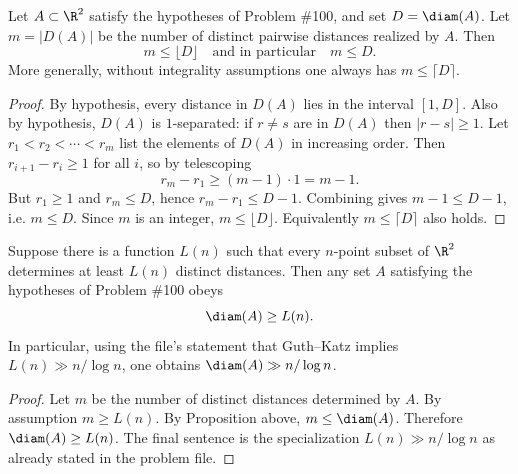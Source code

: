 \begin{proposition}
Let $A\subset\R^2$ satisfy the hypotheses of Problem \#100, and set $D=\diam(A)$. Let $m=|D(A)|$ be the number of distinct pairwise distances realized by $A$. Then
\[m\le \lfloor D\rfloor\quad\text{and in particular}\quad m\le D.
\]
More generally, without integrality assumptions one always has $m\le \lceil D\rceil$.
\end{proposition}

\begin{proof}
By hypothesis, every distance in $D(A)$ lies in the interval $[1,D]$.
Also by hypothesis, $D(A)$ is $1$-separated: if $r\ne s$ are in $D(A)$ then $|r-s|\ge 1$.
Let $r_1<r_2<\cdots<r_m$ list the elements of $D(A)$ in increasing order.
Then $r_{i+1}-r_i\ge 1$ for all $i$, so by telescoping
\[r_m-r_1\ge (m-1)\cdot 1 = m-1.
\]
But $r_1\ge 1$ and $r_m\le D$, hence $r_m-r_1\le D-1$.
Combining gives $m-1\le D-1$, i.e. $m\le D$.
Since $m$ is an integer, $m\le \lfloor D\rfloor$.
Equivalently $m\le \lceil D\rceil$ also holds.
\end{proof}

\begin{corollary}
Suppose there is a function $L(n)$ such that every $n$-point subset of $\R^2$ determines at least $L(n)$ distinct distances. Then any set $A$ satisfying the hypotheses of Problem \#100 obeys
\[\diam(A)\ge L(n).\]
In particular, using the file's statement that Guth--Katz implies $L(n)\gg n/\log n$, one obtains $\diam(A)\gg n/\log n$.
\end{corollary}

\begin{proof}
Let $m$ be the number of distinct distances determined by $A$.
By assumption $m\ge L(n)$.
By Proposition above, $m\le \diam(A)$.
Therefore $\diam(A)\ge L(n)$.
The final sentence is the specialization $L(n)\gg n/\log n$ as already stated in the problem file.
\end{proof}

